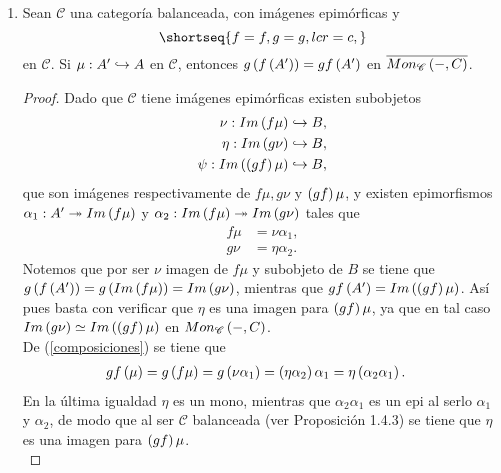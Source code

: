\documentclass{article}
\begin{document}
\begin{enumerate}[label=\textbf{Ej \arabic*.}]
\begin{proof}
			Así se tiene que $\forall a\in A\,\,\,\nu p'(a)=\nu(p'(a))=[a]=\pi(a)$ por lo que $(CoIm_2)$ se cumple y $Mod(R)$ tiene coimagenes.\\
		\end{proof}
		\item Sean $\mathscr{C}$ una categoría balanceada, con imágenes epimórficas y \begin{equation*}
			\shortseq{f=f,g=g,lcr=c,}
		\end{equation*} en $\mathscr{C}$. Si $\catarrow{\mu}{A'}{A}{m}$ en $\mathscr{C}$, entonces  $g\left(f\left(A'\right)\right)=gf\left(A'\right)$ en $\overline{Mon_{\mathscr{C}}\left(-,C\right)}$.
		\begin{proof}
			Dado que $\mathscr{C}$ tiene imágenes epimórficas existen subobjetos
			\begin{align*}
				\catarrow{\nu}{Im\lrprth{f\mu}}{B}{m},\\
				\catarrow{\eta}{Im\lrprth{g\nu}}{B}{m},\\
				\catarrow{\psi}{Im\lrprth{\lrprth{gf}\mu}}{B}{m},				
			\end{align*} 
			que son imágenes respectivamente de $f\mu, g\nu$ y $\left(gf\right)\mu$,
			y existen epimorfismos $\catarrow{\alpha_1}{A'}{Im\lrprth{f\mu}}{e}$ y $\catarrow{\alpha_2}{Im\lrprth{f\mu}}{Im\lrprth{g\nu}}{e}$ tales que
			\begin{equation*}\tag{*}\label{composiciones}
				\begin{split}
					f\mu&=\nu\alpha_1,\\
				g\nu&=\eta\alpha_2.
				\end{split}
			\end{equation*}
			Notemos que por ser $\nu$ imagen de $f\mu$ y subobjeto de $B$ se tiene que $g\left(f\left(A'\right)\right)=g\left(Im\left(f\mu\right)\right)=Im\left(g\nu\right)$, mientras que $gf\left(A'\right)=Im\left(\left(gf\right)\mu\right)$. Así pues basta con verificar que $\eta$ es una imagen para $\left(gf\right)\mu$, ya que en tal caso $Im\left(g\nu\right)\simeq Im\left(\left(gf\right)\mu\right)$ en $Mon_{\mathscr{C}}\left(-,C\right)$.\\
			De (\ref{composiciones}) se tiene que 
			\begin{align*}
				gf\left(\mu\right)&=g\left(f\mu\right)=g\left(\nu\alpha_1\right)=\left(\eta\alpha_2\right)\alpha_1=\eta\left(\alpha_2\alpha_1\right).
			\end{align*}
			En la última igualdad $\eta$ es un mono, mientras que $\alpha_2\alpha_1$ es un epi al serlo $\alpha_1$ y $\alpha_2$, de modo que al ser $\mathscr{C}$ balanceada (ver Proposición 1.4.3) se tiene que $\eta$ es una imagen para $\left(gf\right)\mu$.\\

\end{proof}
\end{enumerate}
\end{document}
